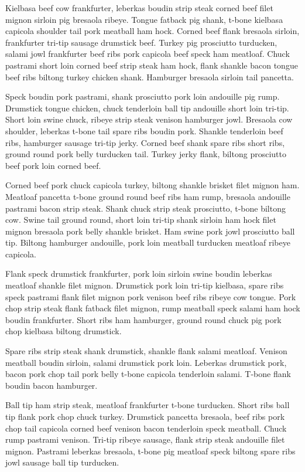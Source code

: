 Kielbasa beef cow frankfurter, leberkas boudin strip steak corned beef filet mignon sirloin pig bresaola ribeye. Tongue fatback pig shank, t-bone kielbasa capicola shoulder tail pork meatball ham hock. Corned beef flank bresaola sirloin, frankfurter tri-tip sausage drumstick beef. Turkey pig prosciutto turducken, salami jowl frankfurter beef ribs pork capicola beef speck ham meatloaf. Chuck pastrami short loin corned beef strip steak ham hock, flank shankle bacon tongue beef ribs biltong turkey chicken shank. Hamburger bresaola sirloin tail pancetta.

Speck boudin pork pastrami, shank prosciutto pork loin andouille pig rump. Drumstick tongue chicken, chuck tenderloin ball tip andouille short loin tri-tip. Short loin swine chuck, ribeye strip steak venison hamburger jowl. Bresaola cow shoulder, leberkas t-bone tail spare ribs boudin pork. Shankle tenderloin beef ribs, hamburger sausage tri-tip jerky. Corned beef shank spare ribs short ribs, ground round pork belly turducken tail. Turkey jerky flank, biltong prosciutto beef pork loin corned beef.

Corned beef pork chuck capicola turkey, biltong shankle brisket filet mignon ham. Meatloaf pancetta t-bone ground round beef ribs ham rump, bresaola andouille pastrami bacon strip steak. Shank chuck strip steak prosciutto, t-bone biltong cow. Swine tail ground round, short loin tri-tip shank sirloin ham hock filet mignon bresaola pork belly shankle brisket. Ham swine pork jowl prosciutto ball tip. Biltong hamburger andouille, pork loin meatball turducken meatloaf ribeye capicola.

Flank speck drumstick frankfurter, pork loin sirloin swine boudin leberkas meatloaf shankle filet mignon. Drumstick pork loin tri-tip kielbasa, spare ribs speck pastrami flank filet mignon pork venison beef ribs ribeye cow tongue. Pork chop strip steak flank fatback filet mignon, rump meatball speck salami ham hock boudin frankfurter. Short ribs ham hamburger, ground round chuck pig pork chop kielbasa biltong drumstick.

Spare ribs strip steak shank drumstick, shankle flank salami meatloaf. Venison meatball boudin sirloin, salami drumstick pork loin. Leberkas drumstick pork, bacon pork chop tail pork belly t-bone capicola tenderloin salami. T-bone flank boudin bacon hamburger.

Ball tip ham strip steak, meatloaf frankfurter t-bone turducken. Short ribs ball tip flank pork chop chuck turkey. Drumstick pancetta bresaola, beef ribs pork chop tail capicola corned beef venison bacon tenderloin speck meatball. Chuck rump pastrami venison. Tri-tip ribeye sausage, flank strip steak andouille filet mignon. Pastrami leberkas bresaola, t-bone pig meatloaf speck biltong spare ribs jowl sausage ball tip turducken.

